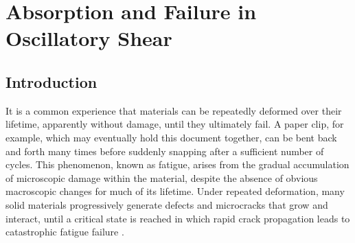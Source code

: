 
\chapter{Absorption and Failure in Oscillatory Shear} \label{sec:Fatigue}

\def\ltilde{\tilde{l}}
\def\gammaMax{\gamma_0}
\def\lw{l_w}
\def\lc{\ell_c}
\def\Origin{\mathbb{G}_{xy}(\bm{0})}
\def\Norm{||\mathbb{G}_{xy}||_2}
\def\CStar{C^\ast}
\def\CycleNineFive{\CStar_{95\%}}
\def\Factive{f_{\mathrm{active}}}

\section{Introduction}

It is a common experience that materials can be repeatedly deformed over their lifetime, apparently without damage, until they ultimately fail. A paper clip, for example, which may eventually hold this document together, can be bent back and forth many times before suddenly snapping after a sufficient number of cycles. This phenomenon, known as fatigue, arises from the gradual accumulation of microscopic damage within the material, despite the absence of obvious macroscopic changes for much of its lifetime. Under repeated deformation, many solid materials progressively generate defects and microcracks that grow and interact, until a critical state is reached in which rapid crack propagation leads to catastrophic fatigue failure \cite{BasquinTheEL,Suresh1998,Anderson2017,DowlingMechanical2013}.

